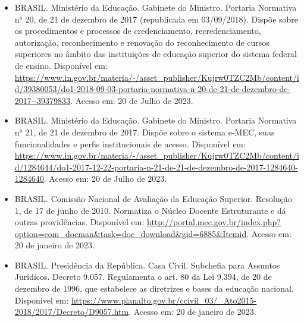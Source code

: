 \begin{itemize}
  \item BRASIL. Ministério da Educação. Gabinete do Ministro. Portaria
    Normativa n° 20, de 21 de dezembro de 2017 (republicada em
    03/09/2018). Dispõe sobre os procedimentos e processos de
    credenciamento, recredenciamento, autorização, reconhecimento e
    renovação do reconhecimento de cursos superiores no âmbito das
    instituições de educação superior do sistema federal de
    ensino. Disponível em:
    \url{https://www.in.gov.br/materia/-/asset_publisher/Kujrw0TZC2Mb/content/id/39380053/do1-2018-09-03-portaria-normativa-n-20-de-21-de-dezembro-de-2017--39379833}.
    Acesso em: 20 de Julho de 2023.
    
    \item BRASIL. Ministério da Educação. Gabinete do Ministro. Portaria
    Normativa n° 21, de 21 de dezembro de 2017. Dispõe sobre o sistema
    e-MEC, suas funcionalidades e perfis institucionais de
    acesso. Disponível em:
    \url{https://www.in.gov.br/materia/-/asset_publisher/Kujrw0TZC2Mb/content/id/1284644/do1-2017-12-22-portaria-n-21-de-21-de-dezembro-de-2017-1284640-1284640}.
    Acesso em: 20 de Julho de 2023.
    
    \item BRASIL. Comissão Nacional de Avaliação da Educação Superior.
    Resolução 1, de 17 de junho de 2010. Normatiza o Núcleo Docente
    Estruturante e dá outras providências. 
    Disponível em: \url{http://portal.mec.gov.br/index.php?option=com_docman&task=doc_download&gid=6885&Itemid}.
    Acesso em: 20 de janeiro de 2023.
    
    \item BRASIL. Presidência da República. Casa Civil. Subchefia para Assuntos
    Jurídicos. Decreto 9.057. Regulamenta o art. 80 da Lei 9.394, de 20 de
    dezembro de 1996, que estabelece as diretrizes e bases da educação
    nacional. 
    Disponível em: \url{https://www.planalto.gov.br/ccivil_03/_Ato2015-2018/2017/Decreto/D9057.htm}.
    Acesso em: 20 de janeiro de 2023.


\end{itemize}
